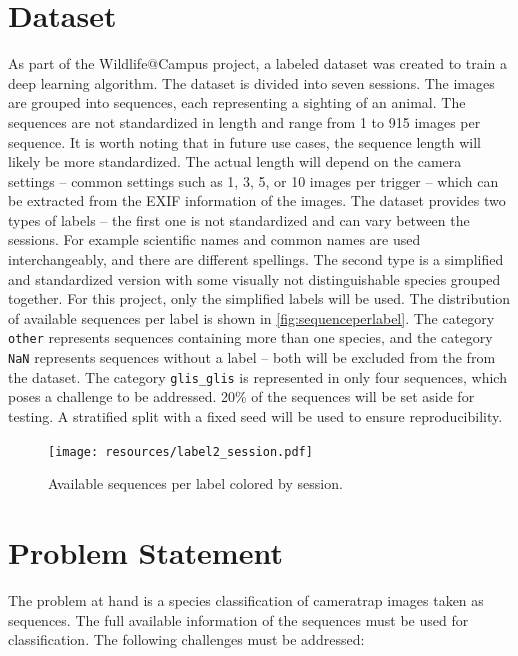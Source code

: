 \documentclass{article}
\begin{document}
\section*{Dataset} %

As part of the Wildlife@Campus project, a labeled dataset was created to train a deep learning algorithm.
The dataset is divided into seven sessions. The images are grouped into sequences, each representing a sighting
of an animal. The sequences are not standardized in length and range from 1 to 915 images per sequence.
It is worth noting that in future use cases, the sequence length will likely be more standardized.
The actual length will depend on the camera settings -- common settings such as 1, 3, 5, or 10 images per trigger --
which can be extracted from the EXIF information of the images. The dataset provides two types of labels --
the first one is not standardized and can vary between the sessions. For example scientific names and common names
are used interchangeably, and there are different spellings. The second type is a simplified and standardized version
with some visually not distinguishable species grouped together. For this project, only the simplified labels
will be used. The distribution of available sequences per label is shown in \autoref{fig:sequenceperlabel}.
The category \texttt{other} represents sequences containing more than one species, and the category \texttt{NaN}
represents sequences without a label -- both will be excluded from the from the dataset.
The category \texttt{glis\_glis} is represented in only four sequences, which poses a challenge to be addressed.
20\% of the sequences will be set aside for testing. A stratified split with a fixed seed will be used to ensure
reproducibility.

\begin{figure}[ht]
  \centering
  \texttt{[image: resources/label2\_session.pdf]}
  \caption{Available sequences per label colored by session.}
  \label{fig:sequenceperlabel}
\end{figure}

\section*{Problem Statement} %

The problem at hand is a species classification of cameratrap images taken as sequences. The full available
information of the sequences must be used for classification. The following challenges must be addressed:
\end{document}
